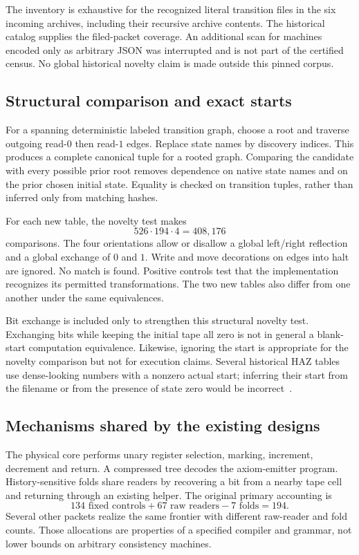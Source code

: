 \documentclass[11pt,letterpaper]{article}
\begin{document}
The inventory is exhaustive for the recognized literal transition files in the six incoming archives, including their recursive archive contents. The historical catalog supplies the filed-packet coverage. An additional scan for machines encoded only as arbitrary JSON was interrupted and is not part of the certified census. No global historical novelty claim is made outside this pinned corpus.



\subsection{Structural comparison and exact starts}

For a spanning deterministic labeled transition graph, choose a root and traverse outgoing read-$0$ then read-$1$ edges. Replace state names by discovery indices. This produces a complete canonical tuple for a rooted graph. Comparing the candidate with every possible prior root removes dependence on native state names and on the prior chosen initial state. Equality is checked on transition tuples, rather than inferred only from matching hashes.

For each new table, the novelty test makes
\[
       526\cdot194\cdot4=408{,}176
\]
comparisons. The four orientations allow or disallow a global left/right reflection and a global exchange of $0$ and $1$. Write and move decorations on edges into halt are ignored. No match is found. Positive controls test that the implementation recognizes its permitted transformations. The two new tables also differ from one another under the same equivalences.

Bit exchange is included only to strengthen this structural novelty test. Exchanging bits while keeping the initial tape all zero is not in general a blank-start computation equivalence. Likewise, ignoring the start is appropriate for the novelty comparison but not for execution claims. Several historical HAZ tables use dense-looking numbers with a nonzero actual start; inferring their start from the filename or from the presence of state zero would be incorrect~\cite{catalog}.

\subsection{Mechanisms shared by the existing designs}

The physical core performs unary register selection, marking, increment, decrement and return. A compressed tree decodes the axiom-emitter program. History-sensitive folds share readers by recovering a bit from a nearby tape cell and returning through an existing helper. The original primary accounting is
\[
       134\text{ fixed controls}+67\text{ raw readers}-7\text{ folds}=194.
\]
Several other packets realize the same frontier with different raw-reader and fold counts. Those allocations are properties of a specified compiler and grammar, not lower bounds on arbitrary consistency machines.
\end{document}
